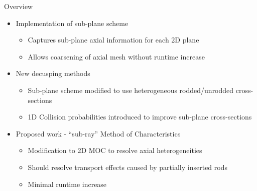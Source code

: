 \begin{frame}[t]{Overview}
  
  \begin{itemize}
    \item Implementation of sub-plane scheme
    \begin{itemize}
      \item Captures sub-plane axial information for each 2D plane
      \item Allows coarsening of axial mesh without runtime increase
    \end{itemize}
    \item New decusping methods
    \begin{itemize}
      \item Sub-plane scheme modified to use heterogeneous rodded/unrodded cross-sections
      \item 1D Collision probabilities introduced to improve sub-plane cross-sections
    \end{itemize}
    \item Proposed work - ``sub-ray'' Method of Characteristics
    \begin{itemize}
      \item Modification to 2D MOC to resolve axial heterogeneities
      \item Should resolve transport effects caused by partially inserted rods
      \item Minimal runtime increase
    \end{itemize}
  \end{itemize}

\end{frame}

